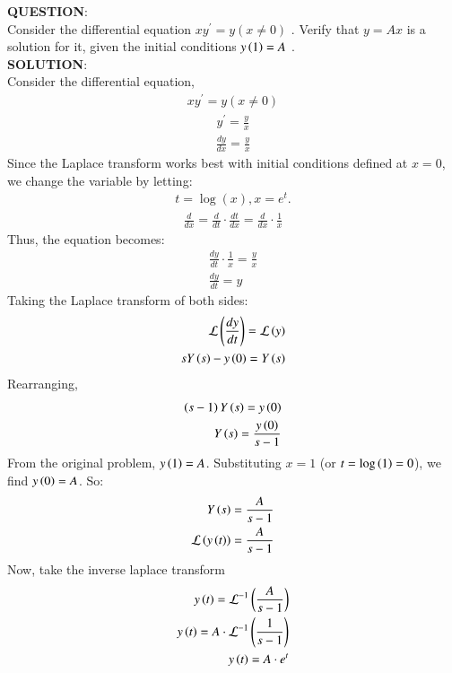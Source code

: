 \documentclass[journal]{IEEEtran}
\begin{document}
			\textbf{QUESTION}:\\
Consider the differential equation $xy^{\prime}=y (x\neq0)$ . Verify that $y = Ax$ is a solution for it, given the initial conditions $ y \left(1\right) = A $ . \\
\textbf{SOLUTION}: \\
Consider the differential equation, 
\begin{align} 
	 xy^{\prime}=y (x\neq0)\label{eq:third} 
\end{align}
\begin{align}
    y^{\prime}=\frac{y}{x}\label{eq:fourth} 
\end{align}
\begin{align}
    \frac{dy}{dx}=\frac{y}{x}
\end{align}
Since the Laplace transform works best with initial conditions defined at $x=0$, we change the variable by letting:
\begin{align}
    t=\log{(x)},x=e^{t}.
\end{align}
\begin{align}
    \frac{d}{dx}=\frac{d}{dt}\cdot\frac{dt}{dx}=\frac{d}{dx}\cdot\frac{1}{x}
\end{align}
Thus, the equation becomes:
\begin{align}
	\frac{dy}{dt}\cdot\frac{1}{x}=\frac{y}{x} \\
    \frac{dy}{dt}=y
\end{align}
Taking the Laplace transform of both sides:
\begin{align}
	\mathcal{L} \left(\frac{dy}{dt}\right)= \mathcal{L} \left(y\right) \\
    sY\left(s\right)-y\left(0\right)=Y\left(s\right)
\end{align}
Rearranging,
\begin{align}
	\left(s-1\right)Y\left(s\right)=y\left(0\right) \\
    Y\left(s\right)=\frac{y\left(0\right)}{s-1}
\end{align} 
\newpage
From the original problem, $y\left(1\right)=A$. Substituting $x=1$ (or $t=\log{\ensuremath{\left(1\right)}}=0$), we find $y\left(0\right)=A$. So:
\begin{align}
	 Y\left(s\right)=\frac{A}{s-1} \\
  \mathcal{L} \left(y\left(t\right)\right) = \frac{A}{s-1}    
\end{align}
Now, take the inverse laplace transform 
\begin{align}
  y\left(t\right)=\mathcal{L}^{-1} \left(\frac{A}{s-1}\right) \\
    y\left(t\right)=A\cdot \mathcal{L}^{-1} \left(\frac{1}{s-1}\right) \\
    y\left(t\right)=A\cdot e^{t}
\end{align}
\end{document}
